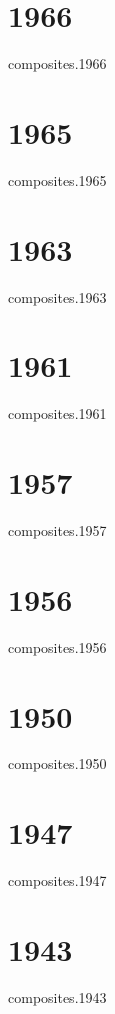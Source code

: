 \documentclass[12pt]{article}
\begin{document}
\section*{1966}
\begin{btSect}{composites.1966}
\btPrintAll
\end{btSect}

\section*{1965}
\begin{btSect}{composites.1965}
\btPrintAll
\end{btSect}

\section*{1963}
\begin{btSect}{composites.1963}
\btPrintAll
\end{btSect}

\section*{1961}
\begin{btSect}{composites.1961}
\btPrintAll
\end{btSect}

\section*{1957}
\begin{btSect}{composites.1957}
\btPrintAll
\end{btSect}

\section*{1956}
\begin{btSect}{composites.1956}
\btPrintAll
\end{btSect}

\section*{1950}
\begin{btSect}{composites.1950}
\btPrintAll
\end{btSect}

\section*{1947}
\begin{btSect}{composites.1947}
\btPrintAll
\end{btSect}

\section*{1943}
\begin{btSect}{composites.1943}
\btPrintAll
\end{btSect}



%
\end{document}
